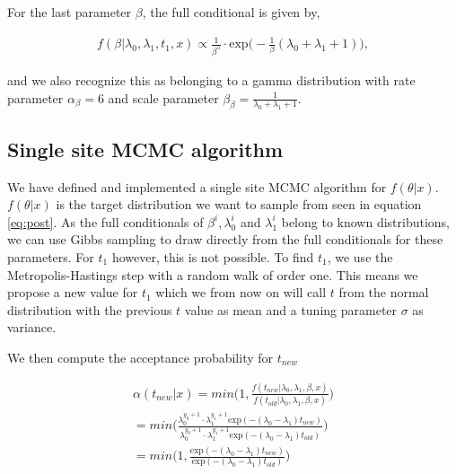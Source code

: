 For the last parameter $\beta$, the full conditional is given by,

\begin{align}
    f(\beta | \lambda_0, \lambda_1, t_1, x) \propto 
    \frac{1}{\beta^5} \cdot \text{exp} \Big( -\frac{1}{\beta}(\lambda_0 + \lambda_1 + 1) \Big),
\end{align}

and we also recognize this as belonging to a gamma distribution with rate parameter $\alpha_{\beta} = 6$ and scale parameter $\beta_{\beta} = \frac{1}{\lambda_0 + \lambda_1 + 1} $. 

\subsection{Single site MCMC algorithm}

We have defined and implemented a single site MCMC algorithm for $f(\theta |x)$. $f(\theta|x)$ is the target distribution we want to sample from seen in equation \ref{eq:post}.  As the full conditionals of $\beta^i, \lambda_0^i$ and $\lambda_1^i$ belong to known distributions, we can use Gibbs sampling to draw directly from the full conditionals for these parameters. For $t_1$ however, this is not possible.
To find $t_1$, we use the Metropolis-Hastings step with a random walk of order one. This means we propose a new value for $t_1$ which we from now on will call $t$ from the normal distribution with the previous $t$ value as mean and a tuning parameter $\sigma$ as variance. 


We then compute the acceptance probability for $t_{new}$

\begin{align}
    \alpha(t_{new}|x) = min \Big( 1, \frac{f(t_{new}| \lambda_0, \lambda_1, \beta, x)}{f(t_{old}| \lambda_0, \lambda_1, \beta, x)} \Big) \nonumber \\ 
    = min \Big( \frac{\lambda_0^{y_0 + 1} \cdot \lambda_1^{y_1 + 1} \text{exp}(-(\lambda_0 - \lambda_1)t_{new})}{\lambda_0^{y_0 + 1} \cdot \lambda_1^{y_1 + 1} \text{exp}(-(\lambda_0 - \lambda_1)t_{old})} \Big) \nonumber \\
    = min \Big( 1, \frac{\text{exp}(-(\lambda_0 - \lambda_1)t_{new})}{\text{exp}(-(\lambda_0 - \lambda_1)t_{old})} \Big)
\end{align}

